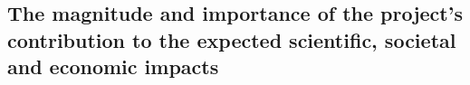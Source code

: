 \subsection{The magnitude and importance of the project’s contribution to the expected scientific, societal and economic impacts}
\label{sec:impactmeasures}
%
%




